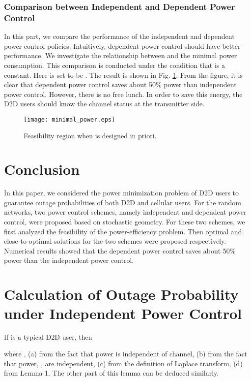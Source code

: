 \documentclass[12pt, draftclsnofoot, journal, letterpaper, onecolumn]{IEEEtran}
\begin{document}
\subsubsection{Comparison between Independent and Dependent Power Control}

In this part, we compare the performance of the independent and dependent power control policies. Intuitively, dependent power control should have better performance. We investigate the relationship between  and the minimal power consumption. This comparison is conducted under the condition that  is a constant. Here  is set to be . The result is shown in Fig. \ref{powercompare}. From the figure, it is clear that dependent power control saves about 50\% power than independent power control. However, there is no free lunch. In order to save this energy, the D2D users should know the channel status at the transmitter side.

\begin{figure}
\center
\texttt{[image: minimal\_power.eps]}
\center\caption{Feasibility region when  is designed in priori.}\label{powercompare}
\end{figure}

\section{Conclusion}

In this paper, we considered the power minimization problem of D2D users to guarantee outage probabilities of both D2D and cellular users. For the random networks, two power control schemes, namely independent and dependent power control, were proposed based on stochastic geometry. For these two schemes, we first analyzed the feasibility of the power-efficiency problem. Then optimal and close-to-optimal solutions for the two schemes were proposed respectively. Numerical results showed that the dependent power control saves about 50\% power than the independent power control.








\appendices
\section{Calculation of Outage Probability under Independent Power Control}\label{COPIPC}
\begin{IEEEproof}
If  is a typical D2D user, then

where ,
(a) from the fact that power is independent of channel,
(b) from the fact that power, ,  are independent,
(c) from the definition of Laplace transform,
(d) from \cite{RPC2} Lemma 1. The other part of this lemma can be deduced similarly.
\end{IEEEproof}
\end{document}
